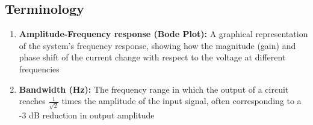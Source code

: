 \documentclass[12pt]{article}
\begin{document}
\subsection{Terminology}
\begin{enumerate}
\item \textbf{Amplitude-Frequency response (Bode Plot):} A graphical representation of the system's frequency response, showing how the magnitude (gain) and phase shift of the current change with respect to the voltage at different frequencies
\item \textbf{Bandwidth (Hz):} The frequency range in which the output of a circuit reaches \(\frac{1}{\sqrt{2}}\) times the amplitude of the input signal, often corresponding to a -3 dB reduction in output amplitude
\end{enumerate}

\end{document}

